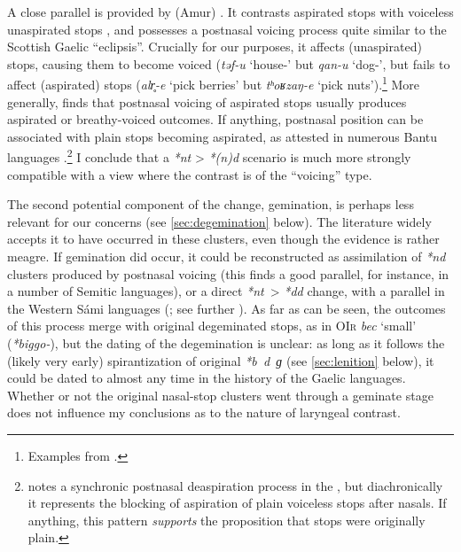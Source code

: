 \documentclass[output=paper,colorlinks,citecolor=brown]{langscibook}
\begin{document}
A close parallel is provided by (Amur)  . It contrasts aspirated  stops \ipa{[pʰ~tʰ~cʰ~kʰ~qʰ]} with voiceless unaspirated  stops \ipa{[p~t~c~k~q]}, and possesses a postnasal voicing process quite similar to the Scottish Gaelic \enquote{eclipsis}. Crucially for our purposes, it affects  (unaspirated) stops, causing them to become voiced (\textit{təf-u} `house-\Pl' but \textit{qan-u} `dog-\Pl', but fails to affect  (aspirated) stops (\textit{alr̥-e} `pick berries' but \textit{tʰoʁzaŋ-e} `pick nuts').\footnote{Examples from \textcite[502]{gruzdeva2024amuric}.} More generally, \textcite[54]{kümmel2007konsonantenwandel} finds that postnasal voicing of aspirated stops usually produces aspirated or breathy\hyp voiced outcomes. If anything, postnasal position can be associated with plain stops becoming aspirated, as attested in numerous Bantu languages \parencite{downing2018nch}.\footnote{\Textcite{hyman-limits} notes a synchronic postnasal deaspiration process in the  , but diachronically it represents the blocking of aspiration of plain voiceless stops after nasals. If anything, this pattern \emph{supports} the proposition that  stops were originally plain.} I conclude that a \textit{*nt} > \textit{*(n)d} scenario is much more strongly compatible with a view where the contrast is of the \enquote{voicing} type.

The second potential component of the change, gemination, is perhaps less relevant for our concerns (see \cref{sec:degemination} below). The literature widely accepts it to have occurred in these clusters, even though the evidence is rather meagre. If gemination did occur, it could be reconstructed as assimilation of \textit{*nd} clusters produced by postnasal voicing (this finds a good parallel, for instance, in a number of Semitic languages), or a direct \textit{*nt}~> \textit{*dd} change, with a parallel in the Western Sámi languages (\cite{sammallahti1998saami}; see further \cite[180--181]{kümmel2007konsonantenwandel}). As far as can be seen, the outcomes of this process merge with original degeminated  stops, as in \textsc{OIr} \textit{bec} `small' (\textit{*biggo-}), but the dating of the degemination is unclear: as long as it follows the (likely very early) spirantization of original \textit{*b~d~ɡ} (see \cref{sec:lenition} below), it could be dated to almost any time in the history of the Gaelic languages. Whether or not the original nasal-stop clusters went through a geminate stage does not influence my conclusions as to the nature of laryngeal contrast.
\end{document}
